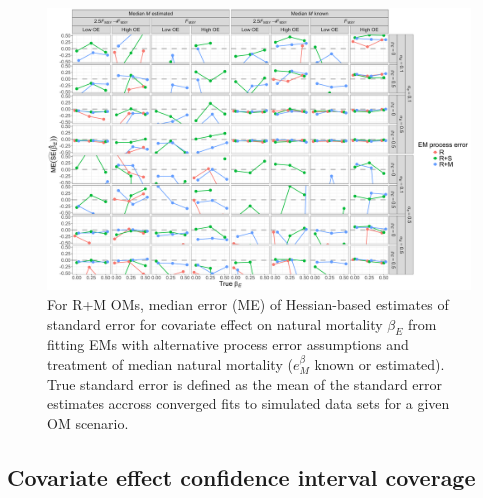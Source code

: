 \documentclass[
  12pt,
]{article}
\begin{document}
\begin{landscape}
\begin{figure}
\begin{center}
\includegraphics[height = \textheight]{se_beta_E_bias_RMom}
\end{center}
\caption{For R+M OMs, median error (ME) of Hessian-based estimates of standard error for covariate effect on natural mortality $\beta_E$ from fitting EMs with alternative process error assumptions and treatment of median natural mortality ($e^\beta_M$ known or estimated). True standard error is defined as the mean of the standard error estimates accross converged fits to simulated data sets for a given OM scenario.}\label{se_beta_E_bias_RMom}
\end{figure}
\end{landscape}

\hypertarget{covariate-effect-confidence-interval-coverage}{%
\subsection*{Covariate effect confidence interval coverage}\label{covariate-effect-confidence-interval-coverage}}
\end{document}
